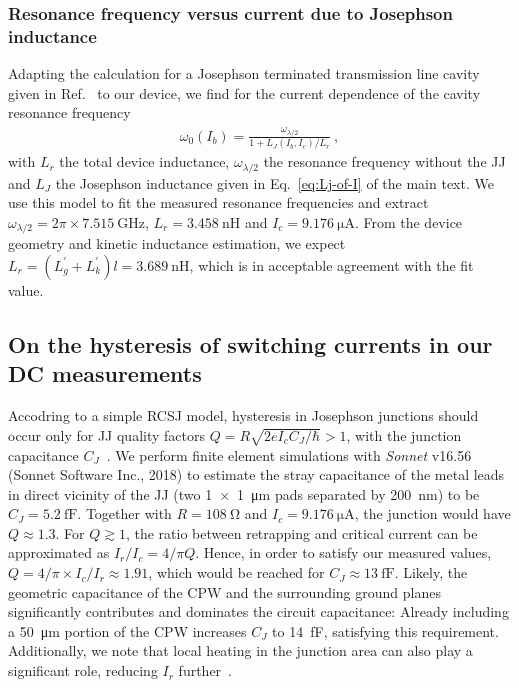 \subsubsection{Resonance frequency versus current due to Josephson inductance}\label{sec:resfit}

% 
Adapting the calculation for a Josephson terminated transmission line cavity given in Ref.~\cite{pogorzalekHystereticFluxResponse2017} to our device, we find for the current dependence of the cavity resonance frequency
% 
\begin{align}
\omega_0(I_b)=\frac{\omega_{\lambda/2}}{1 + L_J(I_b,I_c)/L_r}\ ,
\end{align}
% 
with $L_r$ the total device inductance, $\omega_{\lambda/2}$ the resonance frequency without the JJ and $L_J$ the Josephson inductance given in Eq.~\eqref{eq:Lj-of-I} of the main text.
% 
We use this model to fit the measured resonance frequencies and extract $\omega_{\lambda/2}=2\pi\times\SI{7.515}{\giga\hertz}$, $L_r=\SI{3.458}{\nano\henry}$ and $I_c=\SI{9.176}{\micro\ampere}$.
% 
From the device geometry and kinetic inductance estimation, we expect $L_r=(L_g^\prime+L_k^\prime)l=\SI{3.689}{\nano\henry}$, which is in acceptable agreement with the fit value.

\subsection{On the hysteresis of switching currents in our DC measurements}\label{sec:hysteresis}
% 
Accodring to a simple RCSJ model, hysteresis in Josephson junctions should occur only for JJ quality factors $Q=R\sqrt{2eI_c C_J/\hbar} > 1$, with the junction capacitance $C_J$~\cite{tinkhamIntroductionSuperconductivity1996}.
% 
We perform finite element simulations with \textit{Sonnet} v16.56 (Sonnet Software Inc., 2018) to estimate the stray capacitance of the metal leads in direct vicinity of the JJ (two \SI{1x1}{\micro\meter} pads separated by \SI{200}{\nano\meter}) to be $C_J=\SI{5.2}{\femto\farad}$.
% 
Together with $R=\SI{108}{\ohm}$ and $I_c=\SI{9.176}{\micro\ampere}$, the junction would have $Q\approx1.3$.
% 
For $Q \gtrsim 1$, the ratio between retrapping and critical current can be approximated as $I_r/I_c=4/\pi Q$.
% 
Hence, in order to satisfy our measured values, $Q=4/\pi\times I_c/ I_r\approx1.91$, which would be reached for $C_J\approx\SI{13}{\femto\farad}$.
% 
Likely, the geometric capacitance of the CPW and the surrounding ground planes significantly contributes and dominates the circuit capacitance:
% 
Already including a \SI{50}{\micro\meter} portion of the CPW increases $C_J$ to \SI{14}{\femto\farad}, satisfying this requirement.
% 
Additionally, we note that local heating in the junction area can also play a significant role, reducing $I_r$ further~\cite{skocpolSelfHeatingHotspots1974,hazraHysteresisSuperconductingShort2010,kumarReversibilitySuperconductingNb2015}.

